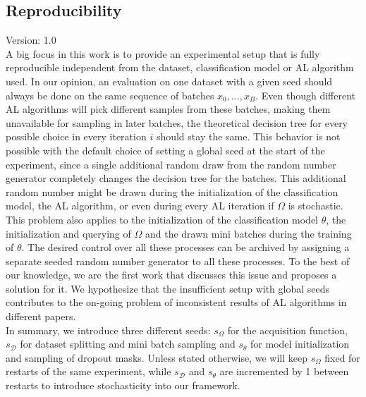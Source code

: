 \documentclass[]{article}
\begin{document}
\subsection{Reproducibility}\label{sec:reproducibility}
{\color{red} Version: 1.0}\\
A big focus in this work is to provide an experimental setup that is fully reproducible independent from the dataset, classification model or AL algorithm used.
In our opinion, an evaluation on one dataset with a given seed should always be done on the same sequence of batches $x_0, \ldots, x_B$.
Even though different AL algorithms will pick different samples from these batches, making them unavailable for sampling in later batches, the theoretical decision tree for every possible choice in every iteration $i$ should stay the same.
This behavior is not possible with the default choice of setting a global seed at the start of the experiment, since a single additional random draw from the random number generator completely changes the decision tree for the batches.
This additional random number might be drawn during the initialization of the classification model, the AL algorithm, or even during every AL iteration if $\Omega$ is stochastic.
This problem also applies to the initialization of the classification model $\theta$, the initialization and querying of $\Omega$ and the drawn mini batches during the training of $\theta$.
The desired control over all these processes can be archived by assigning a separate seeded random number generator to all these processes.
To the best of our knowledge, we are the first work that discusses this issue and proposes a solution for it.
We hypothesize that the insufficient setup with global seeds contributes to the on-going problem of inconsistent results of AL algorithms in different papers. \\ [1mm]
In summary, we introduce three different seeds: $s_\Omega$ for the acquisition function, $s_\mathcal{D}$ for dataset splitting and mini batch sampling and $s_\theta$ for model initialization and sampling of dropout masks.
Unless stated otherwise, we will keep $s_\Omega$ fixed for restarts of the same experiment, while $s_\mathcal{D}$ and $s_\theta$ are incremented by 1 between restarts to introduce stochasticity into our framework.

\end{document}
